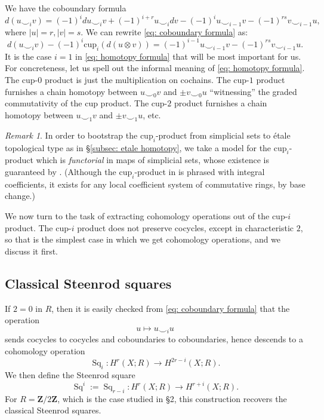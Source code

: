\documentclass[10pt, reqno]{amsart}
\numberwithin{equation}{subsection}
\newcommand{\Z}{\mathbf{Z}}
\newcommand{\mrm}[1]{\mathrm{#1}}
\newcommand{\co}{\colon}
\DeclareMathOperator{\Sq}{Sq}
\theoremstyle{remark}
\newtheorem{remark}[thm]{Remark}
\begin{document}
 We have the coboundary formula \cite[Chapter 2, p. 16]{MoTan68}
\begin{equation}\label{eq: coboundary formula}
d (u  \smile_i v) = (-1)^i d  u \smile_i v + (-1)^{i+r} u  \smile_i d v - (-1)^i u \smile_{i-1} v - (-1)^{rs} v \smile_{i-1} u,  
\end{equation}
where $|u|=r, |v|=s$. We can rewrite \eqref{eq: coboundary formula} as:
\begin{equation}\label{eq: homotopy formula}
d(u \smile_i v) - (-1)^i  \mrm{cup}_i(d(u \otimes v)) = (-1)^{i-1} u \smile_{i-1} v - (-1)^{rs} v \smile_{i-1}u. 
\end{equation}
It is the case $i=1$ in \eqref{eq: homotopy formula} that will be most important for us. For concreteness, let us spell out the informal meaning of \eqref{eq: homotopy formula}. The cup-$0$ product is just the multiplication on cochains. The cup-$1$ product furnishes a chain homotopy between $u \smile_0 v$ and $\pm v \smile_0 u$ ``witnessing'' the graded commutativity of the cup product. The cup-$2$ product furnishes a chain homotopy between $u \smile_1 v$ and $\pm v \smile_1 u$, etc. 

\begin{remark}
In order to bootstrap the $\mrm{cup}_i$-product from simplicial sets to \'{e}tale topological type as in \S \ref{subsec: etale homotopy}, we take a model for the $\mrm{cup}_i$-product which is \emph{functorial} in maps of simplicial sets, whose existence is guaranteed by \cite[Appendix B]{Sm15}. (Although the $\mrm{cup}_i$-product in \cite{Sm15} is phrased with integral coefficients, it exists for any local coefficient system of commutative rings, by base change.) 
\end{remark}

 We now turn to the task of extracting cohomology operations out of the cup-$i$ product. The cup-$i$ product does not preserve cocycles, except in characteristic $2$, so that is the simplest case in which we get cohomology operations, and we discuss it first. 


\subsection{Classical Steenrod squares}\label{subsec: classical Steenrod}

If $2=0$ in $R$, then it is easily checked from \eqref{eq: coboundary formula} that the operation 
\[
u \mapsto u \smile_i u
\]
sends cocycles to cocycles and coboundaries to coboundaries, hence descends to a cohomology operation 
\[
\Sq_i \co H^r(X; R) \rightarrow H^{2r-i}(X; R). 
\]
We then define the Steenrod square 
\[
\Sq^i := \Sq_{r-i} \co H^r(X; R) \rightarrow H^{r+i}(X; R).
\]
 For $R=\Z/2\Z$, which is the case studied in \cite{MoTan68} \S 2, this construction recovers the classical Steenrod squares.
 
\end{document}
